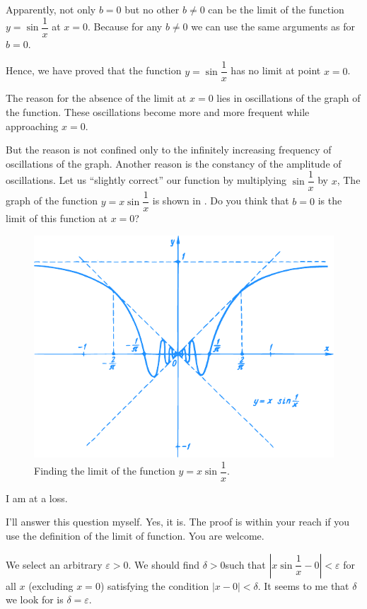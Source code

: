 {\rdr Apparently, not only $b = 0$ but no other $b \neq 0$ can be the limit of the function $y = \sin \dfrac{1}{x}$ at $x= 0$. Because for any $b \neq 0$ we can use the same arguments as for $b = 0$.

\athr Hence, we have proved that the function $y = \sin \dfrac{1}{x}$ has no limit at point $x=0$.

\rdr The reason for the absence of the limit at $x= 0$ lies in oscillations of the graph of the function. These oscillations become more and more frequent while approaching $x= 0$.

\athr But the reason is not confined only to the infinitely increasing frequency of oscillations of the graph. Another reason is the constancy of the amplitude of oscillations. Let us ``slightly correct'' our function by multiplying
$\sin \dfrac{1}{x}$ by $x$, The graph of the function $y = x \sin \dfrac{1}{x}$ is shown in . Do you think that $b= 0$ is the limit of this function at $x = 0$?

\begin{figure}[!ht]%
\centering
\includegraphics[width=\textwidth]{figures/fig-26.pdf}
\caption{Finding the limit of the function $y = x \sin \dfrac{1}{x}$.}
\label{fig-26}
\end{figure}

\rdr I am at a loss.

\athr I'll answer this question myself. Yes, it is. The proof is within your reach if you use the definition of the limit of function. You are welcome.


\rdr We select an arbitrary $\varepsilon > 0$. We should find $\delta > 0$such that $\left| x \sin \dfrac{1}{x} -0 \right|< \varepsilon$ for all $x$ (excluding $x = 0$) satisfying the condition $|x - 0 |< \delta$. It seems
to me that $\delta$ we look for is $\delta = \varepsilon$.

}
